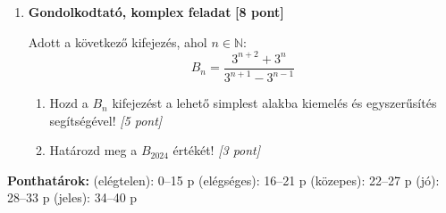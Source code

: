 \documentclass[11pt,a4paper]{article}
\begin{document}
\begin{enumerate}
    Oldód meg a következő exponenciális egyenleteket a valós számok halmazán az alapok azonosságára visszavezetve:
    \begin{enumerate}
        \item $3^{2x-1} = 243$ \hfill \textit{[4 pont]}
        \item $4^{x-1} = \dfrac{1}{8^x}$ \hfill \textit{[4 pont]}
    \end{enumerate}

    \vspace{2mm}
    \item \textbf{Gondolkodtató, komplex feladat} \hfill \textbf{[8 pont]}
    
    Adott a következő kifejezés, ahol $n \in \mathbb{N}$:
    $$B_n = \dfrac{3^{n+2} + 3^n}{3^{n+1} - 3^{n-1}}$$
    \begin{enumerate}
        \item Hozd a $B_n$ kifejezést a lehető simplest alakba kiemelés és egyszerűsítés segítségével! \hfill \textit{[5 pont]}
        \item Határozd meg a $B_{2024}$ értékét! \hfill \textit{[3 pont]}
    \end{enumerate}
\end{enumerate}

\vfill
\noindent
\begin{center}
\small
\textbf{Ponthatárok:}  (elégtelen): 0--15 p  (elégséges): 16--21 p  (közepes): 22--27 p  (jó): 28--33 p  (jeles): 34--40 p
\end{center}
\end{document}
